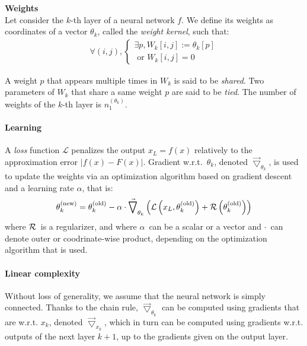 
\begin{definition}\textbf{Weights}\\
Let consider the $k$-th layer of a neural network $f$. We define its weights as coordinates of a vector $\theta_k$, called the \emph{weight kernel}, such that:
\begin{gather*}
  \forall (i,j),
    \begin{cases}
      \exists p, W_k[i,j] := \theta_k[p] \\
      \text{ or } W_k[i,j] = 0
    \end{cases}
\end{gather*}
\end{definition}
A weight $p$ that appears multiple times in $W_k$ is said to be \emph{shared}. Two parameters of $W_k$ that share a same weight $p$ are said to be \emph{tied}. The number of weights of the $k$-th layer is $n_1^{(\theta_k)}$.

\paragraph{Learning}
A \emph{loss} function $\mathcal{L}$ penalizes the output $x_L = f(x)$ relatively to the approximation error $|f(x) - F(x)|$. Gradient w.r.t.~$\theta_k$, denoted $\vec{\bigtriangledown}_{\theta_k}$, is used to update the weights via an optimization algorithm based on gradient descent and a learning rate $\alpha$, that is:
\begin{gather}
\theta_k^{(\text{new})} = \theta_k^{(\text{old})} - \alpha \cdot \vec{\bigtriangledown}_{\theta_k} \left( \mathcal{L}\left( x_L, \theta_k^{(\text{old})} \right) + \mathcal{R}\left( \theta_k^{(\text{old})} \right) \right)
\end{gather}
where $\mathcal{R}$~is a regularizer, and where $\alpha$~can be a scalar or a vector and $\cdot$~can denote outer or coodrinate-wise product, depending on the optimization algorithm that is used.

\paragraph{Linear complexity}
Without loss of generality, we assume that the neural network is simply connected. Thanks to the chain rule, $\vec{\bigtriangledown}_{\theta_k}$ can be computed using gradients that are w.r.t. $x_k$, denoted $\vec{\bigtriangledown}_{x_k}$, which in turn can be computed using gradients w.r.t. outputs of the next layer $k+1$, up to the gradients given on the output layer.

